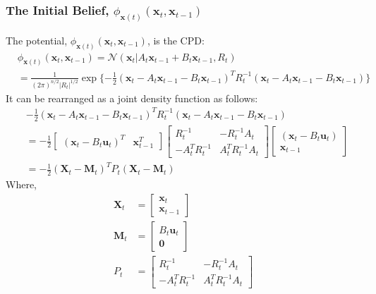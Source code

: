 \subsubsection{The Initial Belief, $\phi_{\pmb{x}(t)} (\pmb{x}_{t}, \pmb{x}_{t-1})$}
\label{subsubsection:initial_pot}

The potential, $\phi_{\pmb{x}(t)} (\pmb{x}_{t}, \pmb{x}_{t-1})$, is the CPD:
\begin{align}
& \phi_{\pmb{x}(t)} (\pmb{x}_{t}, \pmb{x}_{t-1}) = \mathcal{N}\left(\pmb{x}_{t} | A_{t} \pmb{x}_{t-1} + B_{t} \pmb{x}_{t-1}, R_{t} \right) \nonumber \\
 &= \frac{1}{ (2 \pi)^{n/2}| R_{t} |^{1/2} } \exp{ \{ -\frac{1}{2} \left( \pmb{x}_{t} - A_{t} \pmb{x}_{t-1} - B_{t} \pmb{x}_{t-1} \right)^{T} R_{t}^{-1} \left( \pmb{x}_{t} - A_{t} \pmb{x}_{t-1} - B_{t} \pmb{x}_{t-1} \right)\} }
\end{align}
It can be rearranged as a joint density function as follows:
\begin{align}
& -\frac{1}{2} \left( \pmb{x}_{t} - A_{t} \pmb{x}_{t-1} - B_{t} \pmb{x}_{t-1} \right)^{T} R_{t}^{-1} \left( \pmb{x}_{t} - A_{t} \pmb{x}_{t-1} - B_{t} \pmb{x}_{t-1} \right) \nonumber \\
&= -\frac{1}{2} \begin{bmatrix} \left( \pmb{x}_{t} - B_{t} \pmb{u}_{t} \right)^{T} & \pmb{x}_{t-1}^{T} \end{bmatrix} \begin{bmatrix} R_{t}^{-1} & -R_{t}^{-1} A_{t} \\ -A_{t}^{T} R_{t}^{-1} & A_{t}^{T} R_{t}^{-1} A_{t} \end{bmatrix} \begin{bmatrix} \left( \pmb{x}_{t} - B_{t} \pmb{u}_{t} \right) \\ \pmb{x}_{t-1} \end{bmatrix} \nonumber \\
&= -\frac{1}{2} \left( \pmb{X}_{t} - \pmb{M}_t \right)^{T} P_t \left( \pmb{X}_{t} - \pmb{M}_t \right) 
\end{align}
Where,
\begin{align}
\pmb{X}_{t} &= \begin{bmatrix} \pmb{x}_t \\ \pmb{x}_{t-1} \end{bmatrix} \\
\pmb{M}_t &= \begin{bmatrix} B_{t}\pmb{u}_t \\ \pmb{0} \end{bmatrix} \\
P_t &= \begin{bmatrix} R_{t}^{-1} & -R_{t}^{-1} A_{t} \\ -A_{t}^{T} R_{t}^{-1} & A_{t}^{T} R_{t}^{-1} A_{t} \end{bmatrix}
\end{align}
